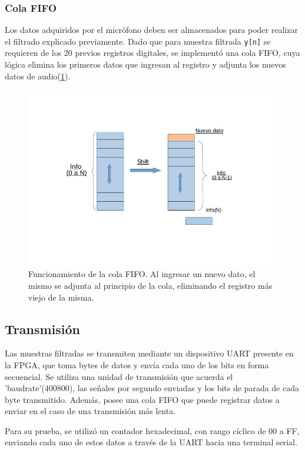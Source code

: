 \documentclass[12pt,letterpaper]{article}
\begin{document}
\subsubsection{Cola FIFO}

Los datos adquiridos por el micrófono deben ser almacenados para poder realizar el filtrado explicado previamente. Dado que para muestra filtrada \texttt{y[n]} se requieren de los 20 previos registros digitales, se implementó una cola FIFO, cuya lógica elimina los primeros datos que ingresan al registro y adjunta los nuevos datos de audio(\ref{fig:fifo_reg}). 

\begin{figure}[H]
  \centering
  \includegraphics[width=0.8\linewidth]{cola_fifo.jpg}
  \caption{Funcionamiento de la cola FIFO. Al ingresar un nuevo dato, el mismo se adjunta al principio de la cola, eliminando el registro más viejo de la misma.}
  \label{fig:fifo_reg}
\end{figure}

\subsection{Transmisión}

Las muestras filtradas se transmiten mediante un dispositivo UART presente en la FPGA, que toma bytes de datos y envía cada uno de los bits en forma secuencial. Se utiliza una unidad de transmisión que acuerda el 'baudrate'(400800), las señales por segundo enviadas y los bits de parada de cada byte transmitido. Además, posee una cola FIFO que puede registrar datos a enviar en el caso de una transmisión más lenta. 

Para su prueba, se utilizó un contador hexadecimal, con rango cíclico de 00 a FF, enviando cada uno de estos datos a través de la UART hacia una terminal serial. 
\end{document}
